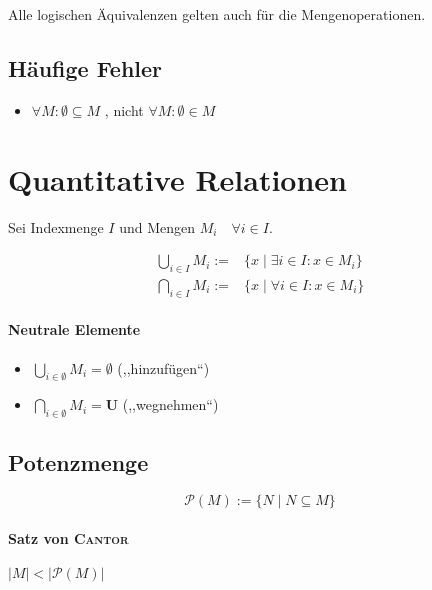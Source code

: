 Alle logischen Äquivalenzen gelten auch für die Mengenoperationen.

\subsection{Häufige Fehler}

\begin{itemize}
  \item $\forall M: \emptyset \boldsymbol{\subseteq} M$
        , nicht
        $\forall M: \emptyset \in M$
\end{itemize}

\section{Quantitative Relationen}

Sei Indexmenge $I$ und Mengen $M_i \quad \forall i \in I$.

\begin{align*}
  \bigcup_{i \in I} M_i
  :=                       & \{x \mid \boldsymbol{\exists} i \in I: x \in M_i \} \\
  \bigcap_{i \in I} M_i := & \{x \mid \boldsymbol{\forall} i \in I: x \in M_i \}
\end{align*}

\paragraph{Neutrale Elemente}

\begin{mzImportant}
  \begin{itemize}
    \item $\bigcup_{i \in \emptyset} M_i = \boldsymbol{\emptyset}$ (,,hinzufügen``)

    \item $\bigcap_{i \in \emptyset} M_i = \boldsymbol{U}$ (,,wegnehmen``)
  \end{itemize}
\end{mzImportant}

\subsection{Potenzmenge}

$$\mathcal{P}(M) := \{N \mid N \subseteq M \}$$

\paragraph{Satz von \textsc{Cantor}} $|M| < |\mathcal{P}(M)|$

